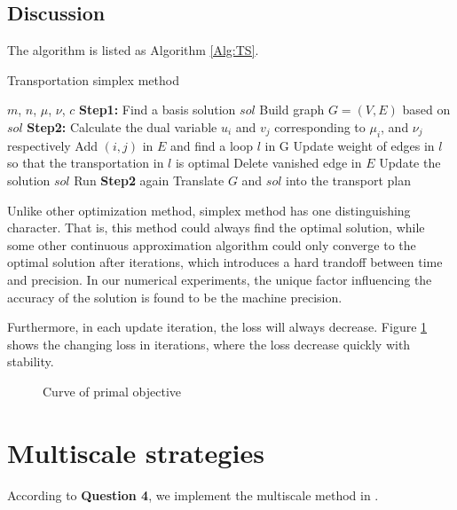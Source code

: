 \documentclass[english]{pkupaper}
\begin{document}
\subsection{Discussion}

The algorithm is listed as Algorithm \ref{Alg:TS}.

\begin{algorithm}
	\caption{Transportation simplex method} \label{Alg:TS}
	\begin{algorithmic}
		\REQUIRE $m$, $n$, $\mu$, $\nu$, $c$
		\STATE \textbf{Step1:} 
		\STATE Find a basis solution $\mathit{sol}$
		\STATE Build graph $G = (V, E)$ based on $\mathit{sol}$
		\STATE \textbf{Step2:} 
		\STATE Calculate the dual variable $u_i$ and $v_j$ corresponding to $\mu_i$, and $\nu_j$ respectively
			\STATE Add $(i, j)$ in $E$ and find a loop $l$ in G
			\STATE Update weight of edges in $l$ so that the transportation in $l$ is optimal
			\STATE Delete vanished edge in $E$
			\STATE Update the solution $\mathit{sol}$
			\STATE Run \textbf{Step2} again
		\ENDIF
		\STATE Translate $G$ and $\mathit{sol}$ into the transport plan
	\end{algorithmic}
\end{algorithm}

Unlike other optimization method, simplex method has one distinguishing character. That is, this method could always find the optimal solution, while some other continuous approximation algorithm could only converge to the optimal solution after iterations, which introduces a hard trandoff between time and precision. In our numerical experiments, the unique factor influencing the accuracy of the solution is found to be the machine precision.

Furthermore, in each update iteration, the loss will always decrease. Figure \ref{Fig:CPO} shows the changing loss in iterations, where the loss decrease quickly with stability.

\begin{figure}
\centering
\scalebox{0.65}{}
\caption{Curve of primal objective} \label{Fig:CPO}
\end{figure}

\section{Multiscale strategies} \label{Sec:MS}

According to \textbf{Question 4}, we implement the multiscale method in \parencite{Gerber2017}.
\end{document}
